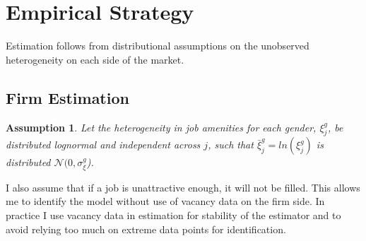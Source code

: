 \documentclass[12pt]{article}
\newtheorem{assumption}{Assumption}
\begin{document}
\section{Empirical Strategy} \label{empirical}


Estimation follows from distributional assumptions on the unobserved heterogeneity on each side of the market.

\subsection{Firm Estimation}

\begin{assumption}
Let the heterogeneity in job amenities for each gender, $\xi^g_j$, be distributed lognormal and independent across $j$, such that $\bar{\xi}^g_j = ln(\xi^g_j)$ is distributed $\mathcal{N}(0, \sigma^g_{\xi}$).
\end{assumption}


I also assume that if a job is unattractive enough, it will not be filled. This allows me to identify the model without use of vacancy data on the firm side. In practice I use vacancy data in estimation for stability of the estimator and to avoid relying too much on extreme data points for identification.






%
%
\end{document}
